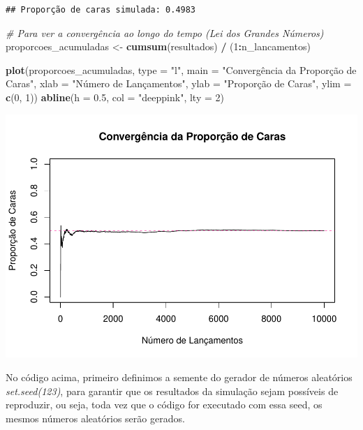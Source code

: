 \documentclass[
]{book}
\newenvironment{Shaded}{\begin{snugshade}}{\end{snugshade}}
\newcommand{\AttributeTok}[1]{\textcolor[rgb]{0.13,0.29,0.53}{#1}}
\newcommand{\CommentTok}[1]{\textcolor[rgb]{0.56,0.35,0.01}{\textit{#1}}}
\newcommand{\DecValTok}[1]{\textcolor[rgb]{0.00,0.00,0.81}{#1}}
\newcommand{\FloatTok}[1]{\textcolor[rgb]{0.00,0.00,0.81}{#1}}
\newcommand{\FunctionTok}[1]{\textcolor[rgb]{0.13,0.29,0.53}{\textbf{#1}}}
\newcommand{\NormalTok}[1]{#1}
\newcommand{\OtherTok}[1]{\textcolor[rgb]{0.56,0.35,0.01}{#1}}
\newcommand{\SpecialCharTok}[1]{\textcolor[rgb]{0.81,0.36,0.00}{\textbf{#1}}}
\newcommand{\StringTok}[1]{\textcolor[rgb]{0.31,0.60,0.02}{#1}}
\begin{document}
\begin{verbatim}
## Proporção de caras simulada: 0.4983
\end{verbatim}

\begin{Shaded}
\begin{Highlighting}[]
\CommentTok{\# Para ver a convergência ao longo do tempo (Lei dos Grandes Números)}
\NormalTok{proporcoes\_acumuladas }\OtherTok{\textless{}{-}} \FunctionTok{cumsum}\NormalTok{(resultados) }\SpecialCharTok{/}\NormalTok{ (}\DecValTok{1}\SpecialCharTok{:}\NormalTok{n\_lancamentos)}

\FunctionTok{plot}\NormalTok{(proporcoes\_acumuladas, }\AttributeTok{type =} \StringTok{"l"}\NormalTok{,}
     \AttributeTok{main =} \StringTok{"Convergência da Proporção de Caras"}\NormalTok{,}
     \AttributeTok{xlab =} \StringTok{"Número de Lançamentos"}\NormalTok{,}
     \AttributeTok{ylab =} \StringTok{"Proporção de Caras"}\NormalTok{,}
     \AttributeTok{ylim =} \FunctionTok{c}\NormalTok{(}\DecValTok{0}\NormalTok{, }\DecValTok{1}\NormalTok{))}
\FunctionTok{abline}\NormalTok{(}\AttributeTok{h =} \FloatTok{0.5}\NormalTok{, }\AttributeTok{col =} \StringTok{"deeppink"}\NormalTok{, }\AttributeTok{lty =} \DecValTok{2}\NormalTok{)}
\end{Highlighting}
\end{Shaded}

\begin{center}\includegraphics{AED_files/figure-latex/simulacao1-1} \end{center}

No código acima, primeiro definimos a semente do gerador de números aleatórios \emph{set.seed(123)}, para garantir que os resultados da simulação sejam possíveis de reproduzir, ou seja, toda vez que o código for executado com essa seed, os mesmos números aleatórios serão gerados.
\end{document}
